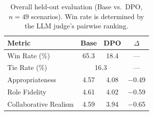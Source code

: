 \begin{table}[t]
\caption{Overall held-out evaluation (Base vs.\ DPO, $n=49$ scenarios). Win rate is determined by the LLM judge's pairwise ranking.}
\label{tab:overall}
\begin{center}
\begin{tabular}{lccc}
\toprule
\textbf{Metric} & \textbf{Base} & \textbf{DPO} & \textbf{$\Delta$} \\
\midrule
Win Rate (\%) & 65.3 & 18.4 & --- \\
Tie Rate (\%) & \multicolumn{2}{c}{16.3} & --- \\
Appropriateness & 4.57 & 4.08 & $-$0.49 \\
Role Fidelity & 4.61 & 4.02 & $-$0.59 \\
Collaborative Realism & 4.59 & 3.94 & $-$0.65 \\
\bottomrule
\end{tabular}
\end{center}
\end{table}

